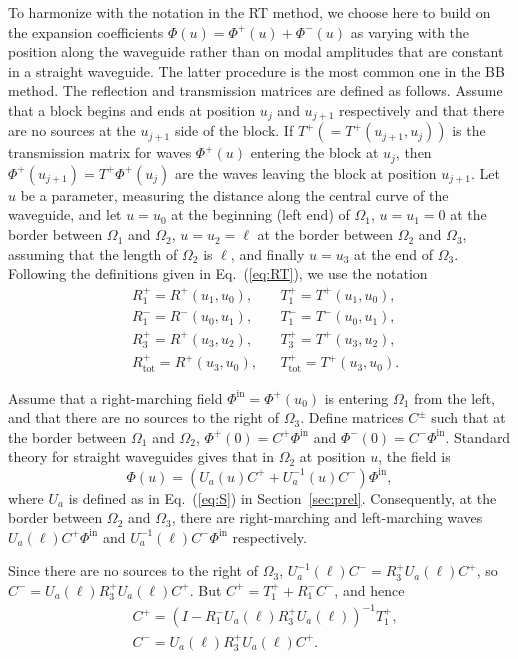 \documentclass[numreferences]{kluwer}
\renewcommand{\Phi}{\varPhi}
\renewcommand{\vec}[1]{\bm{#1}}
\renewcommand{\Phi}{\varPhi}
\newcommand{\Phiin}{\vec\Phi^{\text{in}}}
\newcommand{\Ttot}{T^+_{\text{tot}}}
\newcommand{\Rtot}{R^+_{\text{tot}}}
\begin{document}
To harmonize with the notation in the RT method, we choose here to
build on the expansion coefficients
$\vec\Phi(u)=\vec\Phi^+(u)+\vec\Phi^-(u)$ as varying with the position
along the waveguide rather than on modal amplitudes that are constant
in a straight waveguide. The latter procedure is the most common one
in the BB method. The reflection and transmission matrices are defined as
follows. Assume that a block begins and ends at position $u_j$ and
$u_{j+1}$ respectively and that there are no sources at the $u_{j+1}$
side of the block. If $T^+(=T^+(u_{j+1},u_j))$ is the transmission
matrix for waves $\vec\Phi^+(u)$ entering the block at $u_{j}$, then
$\vec\Phi^+(u_{j+1})=T^+\vec\Phi^+(u_{j})$ are the waves leaving the
block at position $u_{j+1}$. Let $u$ be a parameter, measuring the
distance along the central curve of the waveguide, and let $u=u_0$ at
the beginning (left end) of $\Omega_1$, $u=u_1=0$ at the border
between $\Omega_1$ and $\Omega_2$, $u=u_2=\ell$ at the border between
$\Omega_2$ and $\Omega_3$, assuming that the length of $\Omega_2$ is
$\ell$, and finally $u=u_3$ at the end of $\Omega_3$. Following the
definitions given in Eq.~(\ref{eq:RT}), we use the notation
\begin{align*}
  &R^+_1=R^+(u_1,u_0),&&T^+_1=T^+(u_1,u_0),\\
  &R^-_1=R^-(u_0,u_1),&&T^-_1=T^-(u_0,u_1),\\
  &R^+_3=R^+(u_3,u_2),&&T^+_3=T^+(u_3,u_2),\\
  &\Rtot=R^+(u_3,u_0),&&\Ttot=T^+(u_3,u_0).
\end{align*}

Assume that a right-marching field $\Phiin=\vec\Phi^+(u_0)$ is
entering $\Omega_1$ from the left, and that there are no sources to
the right of $\Omega_3$. Define matrices $C^\pm$ such that at the
border between $\Omega_1$ and $\Omega_2$, $\vec\Phi^+(0)=C^+\Phiin$
and $\vec\Phi^-(0)=C^-\Phiin$. Standard theory for straight waveguides
gives that in $\Omega_2$ at position $u$, the field is
\begin{equation}
  \label{eq:midfield}
  \vec\Phi(u)=(U_a(u)C^++U_a^{-1}(u)C^-)\Phiin,
\end{equation}
where $U_a$ is defined as in Eq.~(\ref{eq:S}) in
Section~\ref{sec:prel}.  Consequently, at the border between
$\Omega_2$ and $\Omega_3$, there are right-marching and left-marching
waves $U_a(\ell)C^+\Phiin$ and $U_a^{-1}(\ell)C^-\Phiin$ respectively.

Since there are no sources to the right of $\Omega_3$,
$U_a^{-1}(\ell)C^-=R_3^{+}U_a(\ell)C^+$, so
$C^-=U_a(\ell)R_3^{+}U_a(\ell)C^+$. But $C^+=T_1^{+}+R_1^{-}C^-$, and
hence
\begin{equation}
  \label{eq:ABRtotTtot}
  \begin{split}
    &C^+=\left(I-R_1^{-}U_a(\ell)R_3^{+}U_a(\ell)\right)^{-1}T_1^{+},\\
    &C^-=U_a(\ell)R_3^{+}U_a(\ell)C^+.
  \end{split}
\end{equation}
\end{document}
